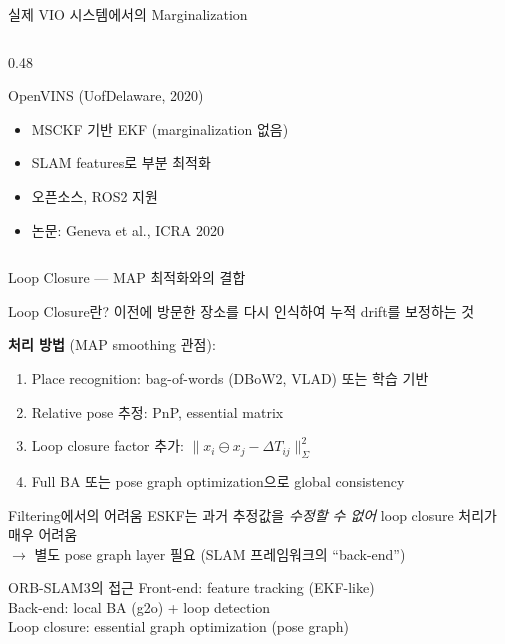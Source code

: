 \begin{frame}{실제 VIO 시스템에서의 Marginalization}
\begin{columns}[T]
    \begin{column}{0.48\textwidth}
      \begin{block}{OpenVINS (UofDelaware, 2020)}
        \begin{itemize}
          \item MSCKF 기반 EKF (marginalization 없음)
          \item SLAM features로 부분 최적화
          \item 오픈소스, ROS2 지원
          \item 논문: Geneva et al., ICRA 2020
        \end{itemize}
      \end{block}
    \end{column}
  \end{columns}
\end{frame}

\begin{frame}{Loop Closure — MAP 최적화와의 결합}
  \begin{block}{Loop Closure란?}
    이전에 방문한 장소를 다시 인식하여 누적 drift를 보정하는 것
  \end{block}
  \pause
  \textbf{처리 방법} (MAP smoothing 관점):
  \begin{enumerate}
    \item Place recognition: bag-of-words (DBoW2, VLAD) 또는 학습 기반
    \item Relative pose 추정: PnP, essential matrix
    \item Loop closure factor 추가: $\|x_i \ominus x_j - \Delta T_{ij}\|_{\Sigma}^2$
    \item Full BA 또는 pose graph optimization으로 global consistency
  \end{enumerate}
  \pause
  \begin{alertblock}{Filtering에서의 어려움}
    ESKF는 과거 추정값을 \emph{수정할 수 없어} loop closure 처리가 매우 어려움\\
    $\to$ 별도 pose graph layer 필요 (SLAM 프레임워크의 ``back-end'')
  \end{alertblock}
  \pause
  \begin{exampleblock}{ORB-SLAM3의 접근}
    Front-end: feature tracking (EKF-like)\\
    Back-end: local BA (g2o) + loop detection\\
    Loop closure: essential graph optimization (pose graph)
  \end{exampleblock}
\end{frame}

